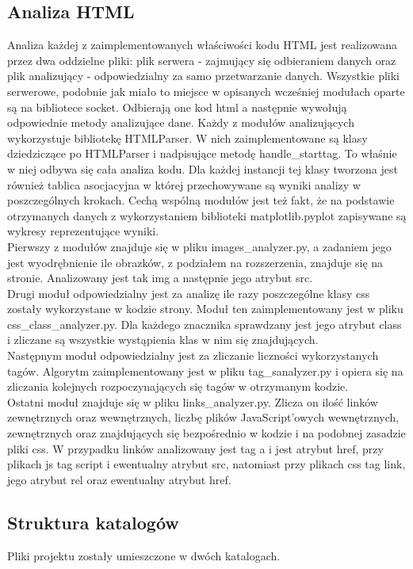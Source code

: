 \documentclass[12pt]{article}
\begin{document}
\subsection{Analiza HTML}
Analiza każdej z zaimplementowanych właściwości kodu HTML jest realizowana przez dwa oddzielne pliki: plik serwera - zajmujący się odbieraniem danych oraz plik analizujący - odpowiedzialny za samo przetwarzanie danych. Wszystkie pliki serwerowe, podobnie jak miało to miejsce w opisanych wcześniej modułach oparte są na bibliotece socket. Odbierają one kod html a następnie wywołują odpowiednie metody analizujące dane. Każdy z modułów analizujących wykorzystuje bibliotekę HTMLParser. W nich zaimplementowane są klasy dziedziczące po HTMLParser i nadpisujące metodę handle\_starttag. To właśnie w niej odbywa się cała analiza kodu. Dla każdej instancji tej klasy tworzona jest również tablica asocjacyjna w której przechowywane są wyniki analizy w poszczególnych krokach. Cechą wspólną modułów jest też fakt, że na podstawie otrzymanych danych z wykorzystaniem biblioteki matplotlib.pyplot zapisywane są wykresy reprezentujące wyniki.\\
Pierwszy z modułów znajduje się w pliku images\_analyzer.py, a zadaniem jego jest wyodrębnienie ile obrazków, z podziałem na rozszerzenia, znajduje się na stronie. Analizowany jest tak img a następnie jego atrybut src.\\
Drugi moduł odpowiedzialny jest za analizę ile razy poszczególne klasy css zostały wykorzystane w kodzie strony. Moduł ten zaimplementowany jest w pliku css\_class\_analyzer.py. Dla każdego znacznika sprawdzany jest jego atrybut class i zliczane są wszystkie wystąpienia klas w nim się znajdujących.\\
Następnym moduł odpowiedzialny jest za zliczanie liczności wykorzystanych tagów. Algorytm zaimplementowany jest w pliku tag\_sanalyzer.py i opiera się na zliczania kolejnych rozpoczynających się tagów w otrzymanym kodzie.\\
Ostatni moduł znajduje się w pliku links\_analyzer.py. Zlicza on ilość linków zewnętrznych oraz wewnętrznych, liczbę plików JavaScript'owych wewnętrznych, zewnętrznych oraz znajdujących się bezpośrednio w kodzie i na podobnej zasadzie pliki css. W przypadku linków analizowany jest tag a i jest atrybut href, przy plikach js tag script i ewentualny atrybut src, natomiast przy plikach css tag link, jego atrybut rel oraz ewentualny atrybut href.
\subsection{Struktura katalogów}
Pliki projektu zostały umieszczone w dwóch katalogach.
\end{document}
